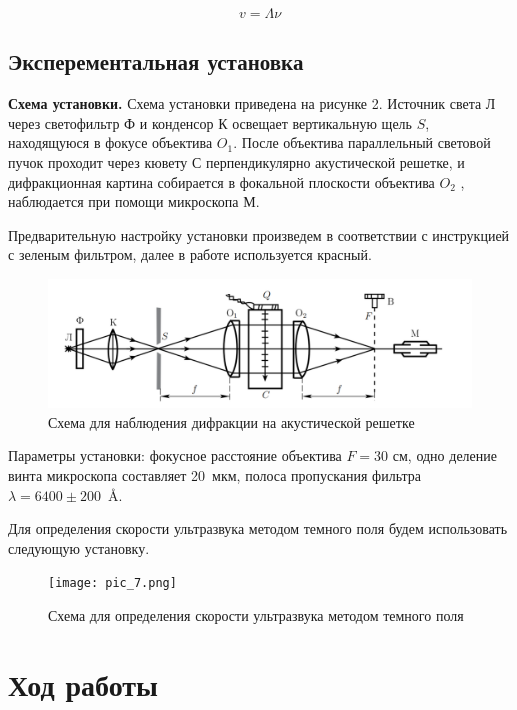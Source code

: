 	\begin{equation}\label{}
	v = \Lambda \nu 
	\end{equation}
	
	\subsection*{Эксперементальная установка}
	
	\textbf{Схема установки. }Схема установки приведена на рисунке 2. Источник света Л через светофильтр Ф и конденсор К освещает вертикальную щель $ S $, находящуюся в фокусе объектива $ O_1 $. После объектива параллельный световой пучок проходит через кювету С перпендикулярно акустической решетке, и дифракционная картина собирается в фокальной плоскости объектива $ O_2 $ , наблюдается при помощи микроскопа М.
	
	Предварительную настройку установки произведем в соответствии с инструкцией с зеленым фильтром, далее в работе используется красный.
	
	\begin{figure}[H]
		\centering	
		\includegraphics[scale=0.3]{images/pic_2.png}
		\caption{Схема для наблюдения дифракции на акустической решетке}
		\label{shema1}
	\end{figure}
	
	Параметры установки: фокусное расстояние объектива $F = 30 $ см, одно деление винта микроскопа составляет 20~мкм, полоса пропускания фильтра \mbox{$\lambda = 6400\pm 200$ Å}.
	
	Для определения скорости ультразвука методом темного поля будем использовать следующую установку.
	\begin{figure}[H]
		\centering	
		\texttt{[image: pic\_7.png]}
		\caption{Схема для определения скорости ультразвука методом темного поля}
		\label{shema2}
	\end{figure}

	\section*{Ход работы}
	
